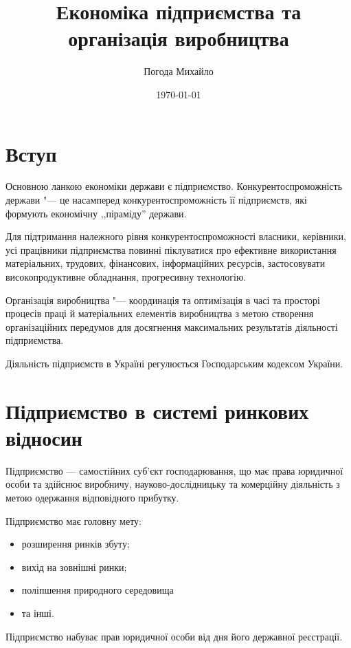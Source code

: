 \documentclass[a4paper,12pt,notitlepage,pdftex,headsepline]{scrartcl}
\author{Погода Михайло}
\title{Економіка підприємства та організація виробництва}
\date{\today}
\begin{document}
\begin{titlepage}
  \maketitle
\end{titlepage}

\tableofcontents
\newpage

\section{Вступ}
  Основною ланкою економіки держави є підприємство.
  Конкурентоспроможність держави "--- це насамперед конкурентоспроможність її
  підприємств, які формують економічну ,,піраміду'' держави.

  Для підтримання належного рівня конкурентоспроможності власники, керівники,
  усі працівники підприємства повинні піклуватися про ефективне використання
  матеріальних, трудових, фінансових, інформаційних ресурсів, застосовувати
  високопродуктивне обладнання, прогресивну технологію.

  Організація виробництва "--- координація та оптимізація в часі та просторі
  процесів праці й матеріальних елементів виробництва з метою створення
  організаційних передумов для досягнення максимальних результатів діяльності
  підприємства.

  Діяльність підприємств в Україні регулюється Господарським кодексом України.

\section{Підприємство в системі ринкових відносин}

  Підприємство --- самостійних суб’єкт господарювання, що має права
  юридичної особи та здійснює виробничу, науково-дослідницьку та комерційну
  діяльність з метою одержання відповідного прибутку.

  Підприємство має головну мету:
  \begin{itemize}
    \item розширення ринків збуту;
    \item вихід на зовнішні ринки;
    \item поліпшення природного середовища
    \item та інші.
  \end{itemize}

  Підприємство набуває прав юридичної особи від дня його державної
  реєстрації.
\end{document}
